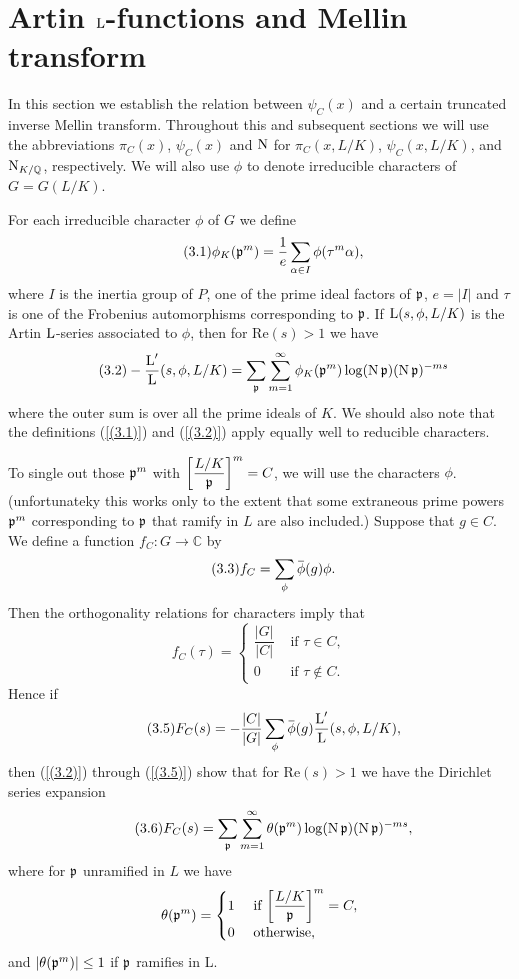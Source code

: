 \documentclass[./main]{subfiles}
\begin{document}
\section{Artin \texorpdfstring{$\operatorname{L}$}{L}-functions and Mellin transform}\setlength{\headheight}{22.54279pt}

In this section we establish the relation between $\psi_C(x)$ and a certain truncated inverse Mellin transform. Throughout this and subsequent sections we will use the abbreviations $\pi_C(x)$, $\psi_C(x)$ and $\operatorname{N}$ for $\pi_C(x, L/K)$, $\psi_C(x, L/K)$, and $\operatorname{N}_{K/\mathbb{Q} }$, respectively. We will also use $\phi$ to denote irreducible characters of $G=G(L/K)$.

For each irreducible character $\phi$ of $G$ we define
\[\tag{3.1}\label{(3.1)}
\phi_K(\mathfrak{p}^m)=\frac{1}{e}\sum_{\alpha \in I} \phi(\tau^m\alpha),\]
where $I$ is the inertia group of $P$, one of the prime ideal factors of $\mathfrak{p}$, $e=|I|$ and $\tau$ is one of the Frobenius automorphisms corresponding to $\mathfrak{p}$. If $\operatorname{L}(s, \phi, L/K)$ is the Artin $\operatorname{L}$-series associated to $\phi$, then for $\text{Re}(s)>1$ we have
\[\tag{3.2}\label{(3.2)}
-\frac{\operatorname{L}'}{\operatorname{L}}(s, \phi, L/K)=\sum_{\mathfrak{p}} \sum_{m=1}^\infty \phi_K(\mathfrak{p}^m)\log (\operatorname{N} \mathfrak{p})(\operatorname{N}\mathfrak{p})^{-ms}\]
where the outer sum is over all the prime ideals of $K$. We should also note that the definitions (\ref{(3.1)}) and (\ref{(3.2)}) apply equally well to reducible characters.

To single out those $\mathfrak{p}^m$ with $\bigg[\dfrac{L/K}{\mathfrak{p}}\bigg]^m=C$, we will use the characters $\phi$. (unfortunateky this works only to the extent that some extraneous prime powers $\mathfrak{p}^m $ corresponding to $\mathfrak{p}$ that ramify in $L$ are also included.) Suppose that $g \in C$. We define a function $f_C:G \longrightarrow \mathbb C$ by
\[ \tag{3.3} \label{(3.3)} f_C= \sum_\phi \xoverline{\phi}(g)\phi.\]
Then the orthogonality relations for characters imply that 
\[ \tag{3.4} \label{(3.4)} f_C(\tau) =\begin{cases} 
\dfrac{|G|}{|C|} & \text{ if } \tau \in C, 
\\
0 & \text{ if } \tau \notin C.
\end{cases}\]
Hence if 
\[\tag{3.5} \label{(3.5)}  F_C(s)=-\frac{|C|}{|G|}\sum_\phi \xoverline{\phi}(g)\frac{\L'}{\L}(s, \phi, L/K) ,  \]
then (\ref{(3.2)}) through (\ref{(3.5)}) show that for $\text{Re}(s)>1$ we have the Dirichlet series expansion
\[\tag{3.6} \label{(3.6)} F_C(s)=\sum_{\mathfrak{p}}\sum_{m=1}^\infty \theta(\mathfrak{p}^m)\log (\operatorname{N}\mathfrak{p})(\operatorname{N}\mathfrak{p})^{-ms},\]
where for $\mathfrak{p}$ unramified in $L$ we have
\[ \theta(\mathfrak{p}^m)=\begin{cases}
1 &\text{ if }\bigg[\dfrac{L/K}{\mathfrak{p}}\bigg]^m=C, \\
0 &\text{ otherwise},
\end{cases}\]
and $|\theta(\mathfrak{p}^m)|\le 1$ if $\mathfrak{p}$ ramifies in L.
\end{document}

